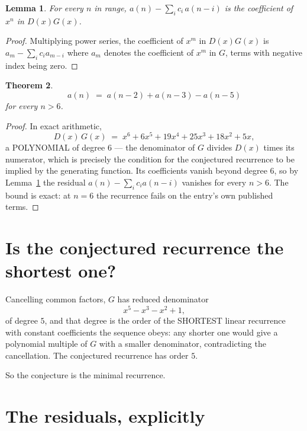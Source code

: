 \documentclass[11pt,a4paper]{article}
\theoremstyle{plain}
\newtheorem{theorem}{Theorem}
\newtheorem{lemma}[theorem]{Lemma}
\theoremstyle{definition}
\begin{document}
\begin{lemma}\label{lem:key}
For every $n$ in range, $a(n)-\sum_i c_i\,a(n-i)$ is the coefficient of $x^{n}$ in
$D(x)G(x)$.
\end{lemma}

\begin{proof}
Multiplying power series, the coefficient of $x^{m}$ in $D(x)G(x)$ is
$a_m-\sum_i c_i a_{m-i}$ where $a_m$ denotes the coefficient of $x^{m}$ in $G$, terms with
negative index being zero.
\end{proof}

\begin{theorem}
\[
a(n)\;=\;a(n-2) + a(n-3) - a(n-5)
\]
for every $n>6$.
\end{theorem}

\begin{proof}
In exact arithmetic,
\[
D(x)\,G(x)\;=\;x^{6} + 6 x^{5} + 19 x^{4} + 25 x^{3} + 18 x^{2} + 5 x,
\]
a POLYNOMIAL of degree $6$ --- the denominator of $G$ divides $D(x)$ times its numerator,
which is precisely the condition for the conjectured recurrence to be implied by the
generating function. Its coefficients vanish beyond degree $6$, so by
Lemma~\ref{lem:key} the residual $a(n)-\sum_ic_ia(n-i)$ vanishes for every
$n>6$. The bound is exact: at $n=6$ the recurrence fails on the entry's own published terms.
\end{proof}

\section{Is the conjectured recurrence the shortest one?}

Cancelling common factors, $G$ has reduced denominator
\[
x^{5} - x^{3} - x^{2} + 1,
\]
of degree $5$, and that degree is the order of the SHORTEST linear recurrence with
constant coefficients the sequence obeys: any shorter one would give a polynomial multiple of
$G$ with a smaller denominator, contradicting the cancellation. The conjectured recurrence has
order $5$.

So the conjecture is the minimal recurrence.

\section{The residuals, explicitly}
\end{document}
